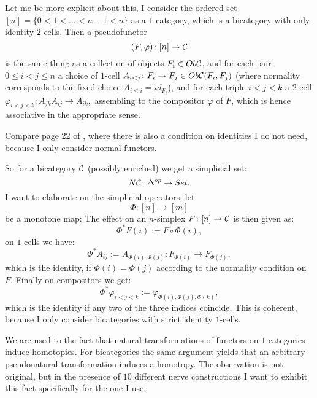Let me be more explicit about this, I consider the ordered set 
$[n]=\{0<1<\ldots<n-1<n\}$ as a $1$-category, which is a bicategory
with only identity $2$-cells. Then a pseudofunctor \[(F,\varphi)\colon
[n]\rightarrow \mathcal{C}\] is the same thing as a collection of objects $F_i 
\in Ob\mathcal{C}$, and for each pair $0\leq i<j\leq n$ a choice of $1$-cell 
$A_{i<j}\colon F_i\rightarrow F_j \in Ob\mathcal{C}(F_i,F_j)$ (where normality
corresponds to the fixed choice $A_{i\leq i}=id_{F_i}$), and for each
triple $i<j<k$ a $2$-cell $\varphi_{i<j<k} \colon A_{jk}A_{ij} 
\rightarrow A_{ik},$ assembling to the compositor $\varphi$ of $F$, 
which is hence associative in the appropriate sense.

Compare page 22 of \cite{LP2008}, where there is also a 
condition on identities I do not need, because I only consider normal 
functors.

So for a bicategory $\mathcal{C}$ (possibly enriched) we get a simplicial set:
\[N\mathcal{C}\colon \Delta^{op}\rightarrow Set.\]I want to elaborate 
on the simplicial operators, let \[\Phi\colon [n] \rightarrow 
[m]\] be a monotone map: The effect on an $n$-simplex $F\colon [n]
\rightarrow \mathcal{C}$ is then given as:\[\Phi^*F(i):= F\circ\Phi(i),
\] on $1$-cells we have: \[\Phi^*A_{ij} := A_{\Phi(i),\Phi(j)}\colon 
F_{\Phi(i)}\rightarrow F_{\Phi(j)},\] which is the identity, if 
$\Phi(i) = \Phi(j)$ according to the normality condition on $F$. 
Finally on compositors we get: \[\Phi^*\varphi_{i<j<k} := 
\varphi_{\Phi(i),\Phi(j),\Phi(k)},\] which is the identity if any two
of the three indices coincide. This is coherent, because I only 
consider bicategories with strict identity $1$-cells.

{}

We are used to the fact that natural transformations of functors on 
$1$-categories induce homotopies. For bicategories the same argument
yields that an arbitrary pseudonatural transformation induces a homotopy.
The observation is not original, but in the presence of $10$ different
nerve constructions I want to exhibit this fact specifically for the one
I use.
{}

